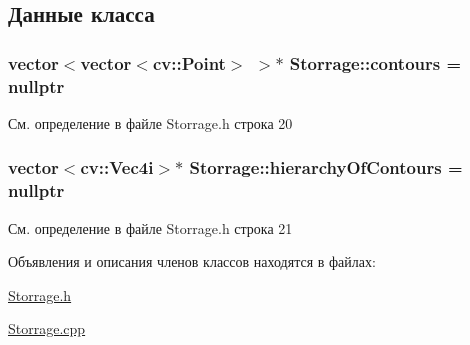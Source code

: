 \subsection{Данные класса}
\hypertarget{class_storrage_a383c9368b9070a2e80ae546b2b403840}{
\subsubsection[{contours}]{\setlength{\rightskip}{0pt plus 5cm}vector$<$vector$<$cv\+::\+Point$>$ $>$$\ast$ Storrage\+::contours = nullptr\hspace{0.3cm}{\ttfamily [private]}}}\label{class_storrage_a383c9368b9070a2e80ae546b2b403840}


См. определение в файле Storrage.\+h строка 20

\hypertarget{class_storrage_a07627c89e8ac2b17b05039ffae257511}{
\subsubsection[{hierarchy\+Of\+Contours}]{\setlength{\rightskip}{0pt plus 5cm}vector$<$cv\+::\+Vec4i$>$$\ast$ Storrage\+::hierarchy\+Of\+Contours = nullptr\hspace{0.3cm}{\ttfamily [private]}}}\label{class_storrage_a07627c89e8ac2b17b05039ffae257511}


См. определение в файле Storrage.\+h строка 21



Объявления и описания членов классов находятся в файлах\+:\begin{DoxyCompactItemize}
\item 
\hyperlink{_storrage_8h}{Storrage.\+h}\item 
\hyperlink{_storrage_8cpp}{Storrage.\+cpp}\end{DoxyCompactItemize}
